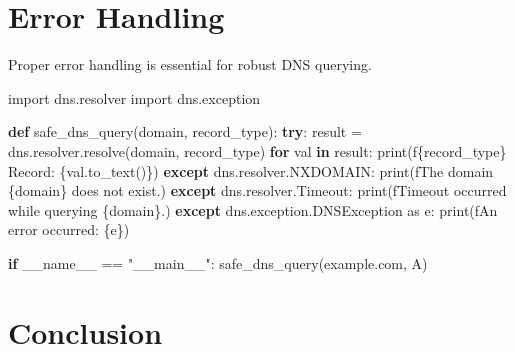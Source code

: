 \documentclass[
  letterpaper,
  DIV=11,
  numbers=noendperiod]{scrreprt}
\newenvironment{Shaded}{\begin{snugshade}}{\end{snugshade}}
\newcommand{\BuiltInTok}[1]{\textcolor[rgb]{0.00,0.23,0.31}{#1}}
\newcommand{\ControlFlowTok}[1]{\textcolor[rgb]{0.00,0.23,0.31}{\textbf{#1}}}
\newcommand{\ImportTok}[1]{\textcolor[rgb]{0.00,0.46,0.62}{#1}}
\newcommand{\KeywordTok}[1]{\textcolor[rgb]{0.00,0.23,0.31}{\textbf{#1}}}
\newcommand{\NormalTok}[1]{\textcolor[rgb]{0.00,0.23,0.31}{#1}}
\newcommand{\OperatorTok}[1]{\textcolor[rgb]{0.37,0.37,0.37}{#1}}
\newcommand{\SpecialCharTok}[1]{\textcolor[rgb]{0.37,0.37,0.37}{#1}}
\newcommand{\SpecialStringTok}[1]{\textcolor[rgb]{0.13,0.47,0.30}{#1}}
\newcommand{\StringTok}[1]{\textcolor[rgb]{0.13,0.47,0.30}{#1}}
\newcommand{\VariableTok}[1]{\textcolor[rgb]{0.07,0.07,0.07}{#1}}
\begin{document}
\section{Error Handling}\label{error-handling-4}

Proper error handling is essential for robust DNS querying.

\begin{Shaded}
\begin{Highlighting}[]
\ImportTok{import}\NormalTok{ dns.resolver}
\ImportTok{import}\NormalTok{ dns.exception}

\KeywordTok{def}\NormalTok{ safe\_dns\_query(domain, record\_type):}
    \ControlFlowTok{try}\NormalTok{:}
\NormalTok{        result }\OperatorTok{=}\NormalTok{ dns.resolver.resolve(domain, record\_type)}
        \ControlFlowTok{for}\NormalTok{ val }\KeywordTok{in}\NormalTok{ result:}
            \BuiltInTok{print}\NormalTok{(}\SpecialStringTok{f\textquotesingle{}}\SpecialCharTok{\{}\NormalTok{record\_type}\SpecialCharTok{\}}\SpecialStringTok{ Record: }\SpecialCharTok{\{}\NormalTok{val}\SpecialCharTok{.}\NormalTok{to\_text()}\SpecialCharTok{\}}\SpecialStringTok{\textquotesingle{}}\NormalTok{)}
    \ControlFlowTok{except}\NormalTok{ dns.resolver.NXDOMAIN:}
        \BuiltInTok{print}\NormalTok{(}\SpecialStringTok{f\textquotesingle{}The domain }\SpecialCharTok{\{}\NormalTok{domain}\SpecialCharTok{\}}\SpecialStringTok{ does not exist.\textquotesingle{}}\NormalTok{)}
    \ControlFlowTok{except}\NormalTok{ dns.resolver.Timeout:}
        \BuiltInTok{print}\NormalTok{(}\SpecialStringTok{f\textquotesingle{}Timeout occurred while querying }\SpecialCharTok{\{}\NormalTok{domain}\SpecialCharTok{\}}\SpecialStringTok{.\textquotesingle{}}\NormalTok{)}
    \ControlFlowTok{except}\NormalTok{ dns.exception.DNSException }\ImportTok{as}\NormalTok{ e:}
        \BuiltInTok{print}\NormalTok{(}\SpecialStringTok{f\textquotesingle{}An error occurred: }\SpecialCharTok{\{}\NormalTok{e}\SpecialCharTok{\}}\SpecialStringTok{\textquotesingle{}}\NormalTok{)}

\ControlFlowTok{if} \VariableTok{\_\_name\_\_} \OperatorTok{==} \StringTok{"\_\_main\_\_"}\NormalTok{:}
\NormalTok{    safe\_dns\_query(}\StringTok{\textquotesingle{}example.com\textquotesingle{}}\NormalTok{, }\StringTok{\textquotesingle{}A\textquotesingle{}}\NormalTok{)}
\end{Highlighting}
\end{Shaded}

\section{Conclusion}\label{conclusion-47}
\end{document}
